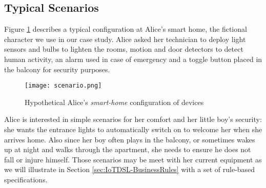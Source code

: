 \subsection{Typical \IOT Scenarios}
\label{sec:Motivation-Scenarios}

Figure \ref{fig:scenario} describes a typical configuration at Alice's smart home, the fictional character we use in our case study. Alice asked her technician to deploy light sensors and bulbs to lighten the rooms, motion and door detectors to detect human activity, an alarm used in case of emergency and a toggle button placed in the balcony for security purposes.

\begin{figure}%
	\centering  
	\texttt{[image: scenario.png]}%
	\caption{Hypothetical Alice's \textit{smart-home} configuration of \IOT devices}%
	\label{fig:scenario}%
\end{figure}

Alice is interested in simple scenarios for her comfort and her little boy's security: she wants the entrance lights to automatically switch on to welcome her when she arrives home. Also since her boy often plays in the balcony, or sometimes wakes up at night and walks through the apartment, she needs to ensure he does not fall or injure himself. Those scenarios may be meet with her current equipment as we will illustrate in Section \ref{sec:IoTDSL-BusinessRules} with a set of rule-based specifications.
